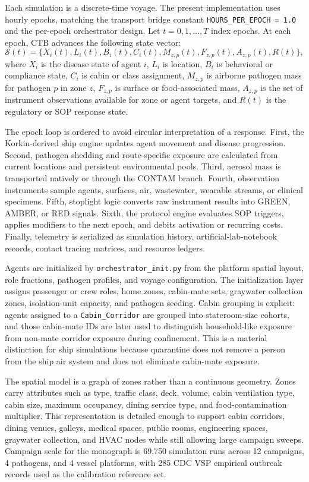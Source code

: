 Each simulation is a discrete-time voyage. The present implementation uses hourly epochs, matching the transport bridge constant \texttt{HOURS\_PER\_EPOCH = 1.0} and the per-epoch
orchestrator design. Let $t=0,1,\ldots,T$ index epochs. At each epoch, CTB advances the following state vector:
\begin{equation}
\mathcal{S}(t)=\{X_i(t), L_i(t), B_i(t), C_i(t), M_{z,p}(t), F_{z,p}(t), A_{z,p}(t), R(t)\},
\end{equation}
where $X_i$ is the disease state of agent $i$, $L_i$ is location, $B_i$ is behavioral or compliance state, $C_i$ is cabin or class assignment, $M_{z,p}$ is airborne pathogen mass for
pathogen $p$ in zone $z$, $F_{z,p}$ is surface or food-associated mass, $A_{z,p}$ is the set of instrument observations available for zone or agent targets, and $R(t)$ is the regulatory or
SOP response state.

The epoch loop is ordered to avoid circular interpretation of a response. First, the Korkin-derived ship engine updates agent movement and disease progression. Second, pathogen shedding and
route-specific exposure are calculated from current locations and persistent environmental pools. Third, aerosol mass is transported natively or through the CONTAM branch. Fourth,
observation instruments sample agents, surfaces, air, wastewater, wearable streams, or clinical specimens. Fifth, stoplight logic converts raw instrument results into GREEN, AMBER, or RED
signals. Sixth, the protocol engine evaluates SOP triggers, applies modifiers to the next epoch, and debits activation or recurring costs. Finally, telemetry is serialized as simulation
history, artificial-lab-notebook records, contact tracing matrices, and resource ledgers.

Agents are initialized by \texttt{orchestrator\_init.py} from the platform spatial layout, role fractions, pathogen profiles, and voyage configuration. The initialization layer assigns
passenger or crew roles, home zones, cabin-mate sets, graywater collection zones, isolation-unit capacity, and pathogen seeding. Cabin grouping is explicit: agents assigned to a
\texttt{Cabin\_Corridor} are grouped into stateroom-size cohorts, and those cabin-mate IDs are later used to distinguish household-like exposure from non-mate corridor exposure during
confinement. This is a material distinction for ship simulations because quarantine does not remove a person from the ship air system and does not eliminate cabin-mate exposure.

The spatial model is a graph of zones rather than a continuous geometry. Zones carry attributes such as type, traffic class, deck, volume, cabin ventilation type, cabin size, maximum
occupancy, dining service type, and food-contamination multiplier. This representation is detailed enough to support cabin corridors, dining venues, galleys, medical spaces, public rooms,
engineering spaces, graywater collection, and HVAC nodes while still allowing large campaign sweeps. Campaign scale for the monograph is 69,750 simulation runs across 12 campaigns, 4
pathogens, and 4 vessel platforms, with 285 CDC VSP empirical outbreak records used as the calibration reference set.

